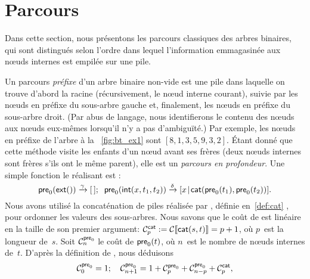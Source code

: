 \section{Parcours}
\label{sec:traversals}

Dans cette section, nous présentons les parcours classiques des arbres
binaires, qui sont distingués selon l'ordre dans lequel l'information
emmagasinée aux n{\oe}uds internes est empilée sur une pile.

\label{preorder}

Un parcours \emph{préfixe} d'un arbre
binaire non-vide est une pile dans laquelle on trouve d'abord la
racine (récursivement, le n{\oe}ud interne courant), suivie par les
n{\oe}uds en préfixe du sous-arbre gauche et, finalement, les
n{\oe}uds en préfixe du sous-arbre droit. (Par abus de langage, nous
identifierons le contenu des n{\oe}uds aux n{\oe}uds eux-mêmes
lorsqu'il n'y a pas d'ambiguïté.) Par exemple, les n{\oe}uds en
préfixe de l'arbre à la \fig~\vref{fig:bt_ex1} sont
\([8,1,3,5,9,3,2]\). Étant donné que cette méthode visite les enfants
d'un n{\oe}ud avant ses frères (deux
n{\oe}uds internes sont frères s'ils ont le même parent), elle est un
\emph{parcours en profondeur}. Une simple fonction le réalisant est :
\begin{equation}
\fun{pre}_0(\fun{ext}()) \xrightarrow{\smash{\gamma}} \el;
\;\;
\fun{pre}_0(\fun{int}(x,t_1,t_2)) \xrightarrow{\smash{\delta}}
 \cons{x}{\fun{cat}(\fun{pre}_0(t_1),\fun{pre}_0(t_2))}.
\label{eq_pre0}
\index{pre0@\fun{pre\(_0\)/1}}
\end{equation}
Nous avons utilisé la concaténation de piles
réalisée par , définie
en~\eqref{def:cat} , pour ordonner les valeurs des
sous-arbres. Nous savons que le coût de  est linéaire en la
taille de son premier argument: \(\C{\fun{cat}}{p} :=
\Call{\fun{cat}(s,t)} = p+1\), où \(p\)~est la longueur de~\(s\). Soit
\(\C{\fun{pre}_0}{n}\) le coût de
\(\fun{pre}_0(t)\), où \(n\)~est le nombre de n{\oe}uds internes
de~\(t\). D'après la définition de , nous déduisons
\begin{equation*}
\C{\fun{pre}_0}{0} = 1;\quad
\C{\fun{pre}_0}{n+1} =
  1 + \C{\fun{pre}_0}{p} + \C{\fun{pre}_0}{n-p} + \C{\fun{cat}}{p},
\index{pre0@$\C{\fun{pre}_0}{n}$}
\end{equation*}
